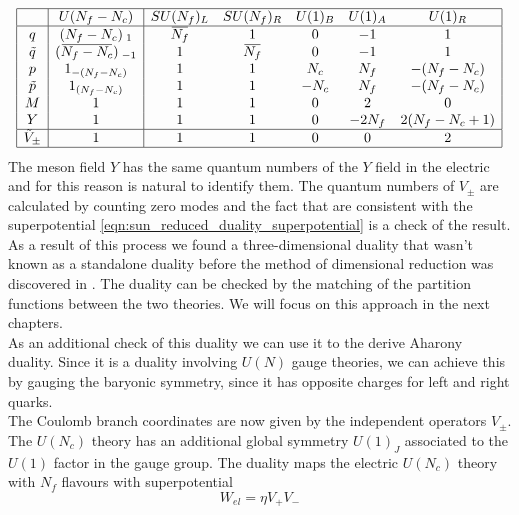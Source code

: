 \begin{equation}
\begin{array} {| c | c | c c c c c |}
\hline
& U(N_f - N_c) & SU(N_f)_L & SU(N_f)_R & U(1)_B & U(1)_A & U(1)_R \\
\hline
q & (N_f - N_c)_{\; 1} & \overbar{N_f} & 1 & 0 & -1 & 1 \\
\tilde{q} & (\overbar{N_f - N_c})_{\;- 1} &   1& \overbar{N_f} & 0 & -1 & 1 \\
p & 1_{-(N_f - N_c)} & 1 &  1 & N_c & N_f & -(N_f - N_c) \\
\tilde{p} & 1_{(N_f - N_c)} & 1 &  1 & - N_c & N_f & -(N_f - N_c) \\
M & 1 & 1 & 1 & 0 & 2 & 0 \\
Y & 1 & 1 & 1 & 0 & - 2 N_f & 2 (N_f - N_c+1)\\
\hline
\tilde{V}_{\pm} & 1 & 1 & 1 &0 & 0 &2\\
\hline
\end{array}
\label{tab:seiberg_3d_charge_mag}
\end{equation}
The meson field $Y$ has the same quantum numbers of the $Y$ field in the electric and for this reason is natural to identify them.
The quantum numbers of $V_{\pm}$ are calculated by counting zero modes and the fact that are consistent with the superpotential \eqref{eqn:sun_reduced_duality_superpotential} is a check of the result.\\
As a result of this process we found a three-dimensional duality that wasn't known as a standalone duality before the method of dimensional reduction was discovered in \cite{Aharony:2013dha}.
The duality can be checked by the matching of the partition functions between the two theories. 
We will focus on this approach in the next chapters. \\
As an additional check of this duality we can use it to the derive Aharony duality. 
Since it is a duality involving $U(N)$ gauge theories, we can achieve this by gauging the baryonic symmetry, since it has opposite charges for left and right quarks. \\
The Coulomb branch coordinates are now given by the independent operators $V_{\pm}$.
The $U(N_c)$ theory has an additional global symmetry $U(1)_J$ associated to the $U(1)$ factor in the gauge group. 
The duality maps the electric $U(N_c)$ theory with $N_f$ flavours with superpotential
\begin{equation}
W_{el} = \eta V_+ V_-
\end{equation}
